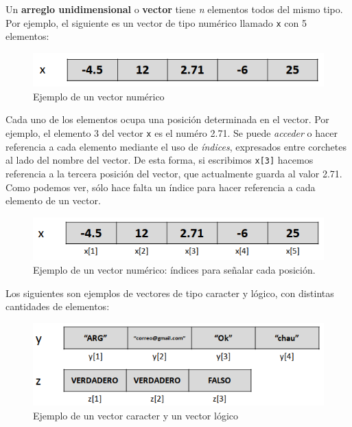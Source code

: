 \documentclass[
]{book}
\begin{document}
Un \textbf{arreglo unidimensional} o \textbf{vector} tiene \emph{n} elementos todos del mismo tipo. Por ejemplo, el siguiente es un vector de tipo numérico llamado \texttt{x} con 5 elementos:

\begin{figure}

{\centering \includegraphics[width=0.6\linewidth]{images/05_estructuras/estr01} 

}

\caption{Ejemplo de un vector numérico}\label{fig:unnamed-chunk-92}
\end{figure}

Cada uno de los elementos ocupa una posición determinada en el vector. Por ejemplo, el elemento 3 del vector \texttt{x} es el numéro 2.71. Se puede \emph{acceder} o hacer referencia a cada elemento mediante el uso de \emph{índices}, expresados entre corchetes al lado del nombre del vector. De esta forma, si escribimos \texttt{x{[}3{]}} hacemos referencia a la tercera posición del vector, que actualmente guarda al valor 2.71. Como podemos ver, sólo hace falta un índice para hacer referencia a cada elemento de un vector.

\begin{figure}

{\centering \includegraphics[width=0.6\linewidth]{images/05_estructuras/estr02} 

}

\caption{Ejemplo de un vector numérico: índices para señalar cada posición.}\label{fig:unnamed-chunk-93}
\end{figure}

Los siguientes son ejemplos de vectores de tipo caracter y lógico, con distintas cantidades de elementos:

\begin{figure}

{\centering \includegraphics[width=0.6\linewidth]{images/05_estructuras/estr03} 

}

\caption{Ejemplo de un vector caracter y un vector lógico}\label{fig:unnamed-chunk-94}
\end{figure}
\end{document}
